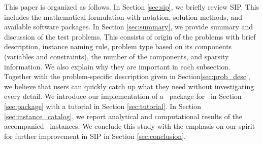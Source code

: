 This paper is organized as follows. In Section \ref{sec:sip}, we briefly review SIP. This includes the mathematical formulation with notation, solution methods, and available software packages. In Section \ref{sec:summary}, we provide summary and discussion of the test problems. This consists of origin of the problems with brief description, instance naming rule, problem type based on its components (variables and constraints), the number of the components, and sparsity information. We also explain why they are important in each subsection. Together with the problem-specific description given in Section\ref{sec:prob_desc}, we believe that users can quickly catch up what they need without investigating every detail. We introduce our implementation of a \julia\ package for \siplibtwo\ in Section \ref{sec:package} with a tutorial in Section \ref{sec:tutorial}. In Section \ref{sec:instance_catalog}, we report analytical and computational results of the accompanied \smps\ instances. We conclude this study with the emphasis on our spirit for further improvement in SIP in Section \ref{sec:conclusion}. 







